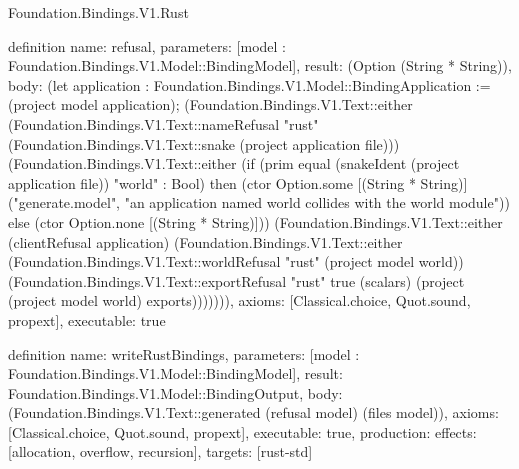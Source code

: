 \begin{lexlean}{Foundation.Bindings.V1.Rust}
\begin{semanticmodule}
definition{
  name: refusal,
  parameters: [model : Foundation.Bindings.V1.Model::BindingModel],
  result: (Option (String * String)),
  body: (let application : Foundation.Bindings.V1.Model::BindingApplication := (project model application); (Foundation.Bindings.V1.Text::either (Foundation.Bindings.V1.Text::nameRefusal "rust" (Foundation.Bindings.V1.Text::snake (project application file))) (Foundation.Bindings.V1.Text::either (if (prim equal (snakeIdent (project application file)) "world" : Bool) then (ctor Option.some [(String * String)] ("generate.model", "an application named world collides with the world module")) else (ctor Option.none [(String * String)])) (Foundation.Bindings.V1.Text::either (clientRefusal application) (Foundation.Bindings.V1.Text::either (Foundation.Bindings.V1.Text::worldRefusal "rust" (project model world)) (Foundation.Bindings.V1.Text::exportRefusal "rust" true (scalars) (project (project model world) exports))))))),
  axioms: [Classical.choice, Quot.sound, propext],
  executable: true
}

definition{
  name: writeRustBindings,
  parameters: [model : Foundation.Bindings.V1.Model::BindingModel],
  result: Foundation.Bindings.V1.Model::BindingOutput,
  body: (Foundation.Bindings.V1.Text::generated (refusal model) (files model)),
  axioms: [Classical.choice, Quot.sound, propext],
  executable: true,
  production: {effects: [allocation, overflow, recursion], targets: [rust-std]}
}
\end{semanticmodule}
\end{lexlean}
